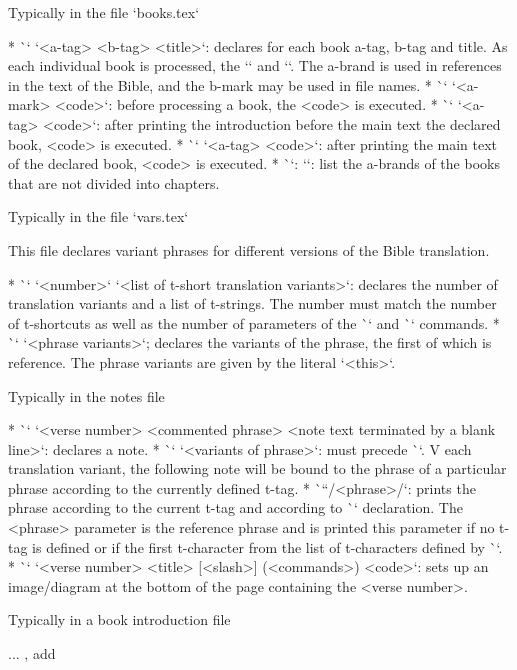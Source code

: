 {{{{\secc Typically in the file `books.tex`

\begitems
* \`\BookTitle` `<a-tag> <b-tag> <title>`: declares for each book
  a-tag, b-tag and title. As each individual book is processed, the
  `\def\amark{<a-mark>}` and `\def\bmark{b-mark}`. The a-brand is used in
  references in the text of the Bible, and the b-mark may be used in file names.
* \`\BookException` `<a-mark> {<code>}`: before processing a book, the
  <code> is executed.
* \`\BookPre` `<a-tag> {<code>}`: after printing the introduction before the main text
  the declared book, <code> is executed.
* \`\BookPost` `<a-tag> {<code>}`: after printing the main text
  of the declared book, <code> is executed.
* \`\nochapbooks`: `\def\nochapbooks{<list>}`: list the a-brands of the books that
  are not divided into chapters.
\enditems

\secc Typically in the file `vars.tex`

This file declares variant phrases for different versions of the Bible translation.

\begitems
* \`\variants` `<number>` `<list of t-short translation variants>`: declares the number of
  translation variants and a list of \hbox{t-strings}. The number must match the number of
  t-shortcuts as well as the number of parameters of the \`\vdef` and \`\ww` commands.
* \`\vdef` `<phrase variants>`; declares the variants of the phrase, the first of which is
  reference. The phrase variants are given by the literal `{<this>}`.
\enditems

\secc Typically in the notes file

\begitems
* \`\Note` `<verse number> {<commented phrase>} <note text terminated by a blank line>`:
  declares a note.
* \`\ww` `<variants of phrase>`: must precede \`\Note`. V
  each translation variant, the following note will be bound to the phrase
  of a particular phrase according to the currently defined t-tag.
* \`\x``/<phrase>/`: prints the phrase according to the current t-tag and according to
  \`\vdef` declaration. The <phrase> parameter is the reference phrase and is printed
  this parameter if no t-tag is defined or if the first
  t-character from the list of t-characters defined by \`\variants`.
* \`\putBot` `<verse number> {<title>} [<slash>] (<commands>) {<code>}`:
  sets up an image/diagram at the bottom of the page containing the <verse number>.
\enditems

\secc Typically in a book introduction file

... \TODO, add

}}}}
